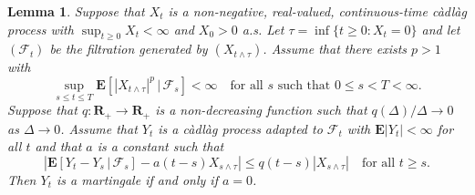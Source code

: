 \documentclass[JEP,XML,SOM,Unicode]{cedram}
\let\mathcal\mathscr
\theoremstyle{plain}
\numberwithin{theorem}{section}
\newtheorem{lemma}[theorem]{Lemma}
\theoremstyle{definition}
\newcommand{\CF}{{\mathcal F}}
\newcommand \E {{\mathbf E}}
\newcommand{\R}{\mathbf{R}}
\newcommand{\cadlag}{càdlàg}
\newcommand{\giv}{\,|\,}
\begin{document}
\begin{lemma}
\label{lem::m_t_martingale}
Suppose that $X_t$ is a non-negative, real-valued, continuous-time {\cadlag} process with $\sup_{t \geq 0} X_t < \infty$ and $X_0 > 0$ a.s. Let $\tau = \inf\{t \geq 0 : X_t = 0\}$ and let $(\CF_t)$ be the filtration generated by $(X_{t \wedge \tau})$. Assume that there exists $p > 1$ with
\begin{equation}
\label{eqn::x_u_ui}
\sup_{s \leq t \leq T}\E[ |X_{t \wedge \tau}|^p \giv \CF_s] < \infty \quad\text{for all $s$ such that } 0 \leq s < T < \infty.
\end{equation}
Suppose that $q \colon \R_+ \to \R_+$ is a non-decreasing function such that $q(\Delta)/\Delta \to 0$ as $\Delta \to 0$. Assume that $Y_t$ is a {\cadlag} process adapted to $\CF_t$ with $\E|Y_t| < \infty$ for all $t$ and that $a$ is a constant such that
\[
\left| \E[ Y_t - Y_s \giv \CF_s ] - a (t-s) X_{s \wedge \tau} \right| \leq q(t-s)|X_{s\wedge \tau}| \quad\text{for all } t \geq s.
\]
Then $Y_t$ is a martingale if and only if $a=0$.
\end{lemma}
\end{document}
